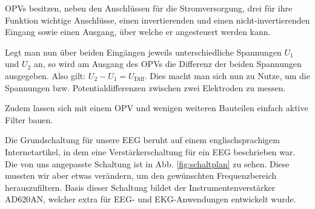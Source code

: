 \documentclass[10pt]{article}
\begin{document}
OPVs besitzen, neben den Anschlüssen für die Stromversorgung, drei für ihre Funktion wichtige Anschlüsse, einen invertierenden und einen nicht-invertierenden Eingang sowie einen Ausgang, über welche er angesteuert werden kann.

Legt man nun über beiden Eingängen jeweils unterschiedliche Spannungen $U_{1}$ und $U_{2}$ an, so wird am Ausgang des OPVs die Differenz der beiden Spannungen ausgegeben. Also gilt: $U_{2} - U_{1} = U_{\textrm{Diff}}$. 
Dies macht man sich nun zu Nutze, um die Spannungen bzw. Potentialdifferenzen zwischen zwei Elektroden zu messen. 

Zudem lassen sich mit einem OPV und wenigen weiteren Bauteilen einfach aktive Filter bauen.

Die Grundschaltung für unsere EEG beruht auf einem englischsprachigem Internetartikel, in dem eine Verstärkerschaltung für ein EEG beschrieben war. Die von uns angepasste Schaltung ist in Abb. \ref{fig:schaltplan} zu sehen.
Diese mussten wir aber etwas verändern, um den gewünschten Frequenzbereich herauszufiltern.
Basis dieser Schaltung bildet der Instrumentenverstärker AD620AN, welcher extra für EEG- und EKG-Anwendungen entwickelt wurde.
\end{document}
